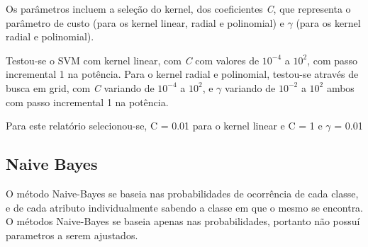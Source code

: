 Os parâmetros incluem a seleção do kernel, dos coeficientes \emph{C}, que representa o parâmetro de custo (para os kernel linear, radial e polinomial) e \(\gamma\) (para os kernel radial e polinomial).

Testou-se o SVM com kernel linear, com \emph{C} com valores de \(10^{-4}\) a \(10^2\), com passo incremental 1 na potência. Para o kernel radial e polinomial, testou-se através de busca em grid, com \emph{C} variando de \(10^{-4}\) a \(10^2\), e \(\gamma\) variando de \(10^{-2}\) a \(10^2\) ambos com passo incremental 1 na potência.

Para este relatório selecionou-se, C = 0.01 para o kernel linear e C = 1 e \(\gamma\) = 0.01

\subsection{Naive Bayes}

O método Naive-Bayes se baseia nas probabilidades de ocorrência de cada classe, e de cada atributo individualmente sabendo a classe em que o mesmo se encontra. O métodos Naive-Bayes se baseia apenas nas probabilidades, portanto não possuí parametros a serem ajustados.

